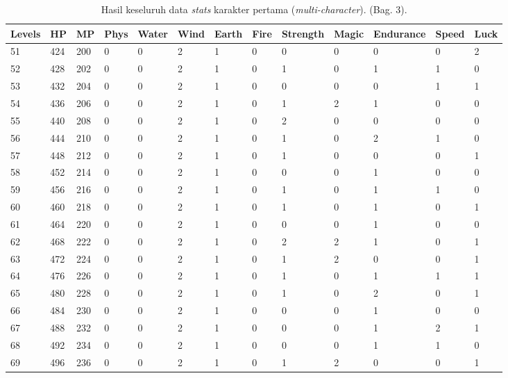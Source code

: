 \begin{sidewaystable}[!h]
	\centering
	\caption{Hasil keseluruh data \textit{stats} karakter pertama (\textit{multi-character}). (Bag. 3).}
	\label{tb:player_all_stats_3_1}
	\vspace{1ex}
	\begin{tabular}{|l|l|l|l|l|l|l|l|l|l|l|l|l|}
		\hline
		\rowcolor[HTML]{C0C0C0} 
		\textbf{Levels} & \textbf{HP} & \textbf{MP} & \textbf{Phys} & \textbf{Water} & \textbf{Wind} & \textbf{Earth} & \textbf{Fire} & \textbf{Strength} & \textbf{Magic} & \textbf{Endurance} & \textbf{Speed} & \textbf{Luck} \\ \hline
		51 & 424 & 200 & 0 & 0 & 2 & 1 & 0 & 0 & 0 & 0 & 0 & 2 \\ \hline
		52 & 428 & 202 & 0 & 0 & 2 & 1 & 0 & 1 & 0 & 1 & 1 & 0 \\ \hline
		53 & 432 & 204 & 0 & 0 & 2 & 1 & 0 & 0 & 0 & 0 & 1 & 1 \\ \hline
		54 & 436 & 206 & 0 & 0 & 2 & 1 & 0 & 1 & 2 & 1 & 0 & 0 \\ \hline
		55 & 440 & 208 & 0 & 0 & 2 & 1 & 0 & 2 & 0 & 0 & 0 & 0 \\ \hline
		56 & 444 & 210 & 0 & 0 & 2 & 1 & 0 & 1 & 0 & 2 & 1 & 0 \\ \hline
		57 & 448 & 212 & 0 & 0 & 2 & 1 & 0 & 1 & 0 & 0 & 0 & 1 \\ \hline
		58 & 452 & 214 & 0 & 0 & 2 & 1 & 0 & 0 & 0 & 1 & 0 & 0 \\ \hline
		59 & 456 & 216 & 0 & 0 & 2 & 1 & 0 & 1 & 0 & 1 & 1 & 0 \\ \hline
		60 & 460 & 218 & 0 & 0 & 2 & 1 & 0 & 1 & 0 & 1 & 0 & 1 \\ \hline
		61 & 464 & 220 & 0 & 0 & 2 & 1 & 0 & 0 & 0 & 1 & 0 & 0 \\ \hline
		62 & 468 & 222 & 0 & 0 & 2 & 1 & 0 & 2 & 2 & 1 & 0 & 1 \\ \hline
		63 & 472 & 224 & 0 & 0 & 2 & 1 & 0 & 1 & 2 & 0 & 0 & 1 \\ \hline
		64 & 476 & 226 & 0 & 0 & 2 & 1 & 0 & 1 & 0 & 1 & 1 & 1 \\ \hline
		65 & 480 & 228 & 0 & 0 & 2 & 1 & 0 & 1 & 0 & 2 & 0 & 1 \\ \hline
		66 & 484 & 230 & 0 & 0 & 2 & 1 & 0 & 0 & 0 & 1 & 0 & 0 \\ \hline
		67 & 488 & 232 & 0 & 0 & 2 & 1 & 0 & 0 & 0 & 1 & 2 & 1 \\ \hline
		68 & 492 & 234 & 0 & 0 & 2 & 1 & 0 & 0 & 0 & 1 & 1 & 0 \\ \hline
		69 & 496 & 236 & 0 & 0 & 2 & 1 & 0 & 1 & 2 & 0 & 0 & 1 \\ \hline

\end{tabular}
\end{sidewaystable}
